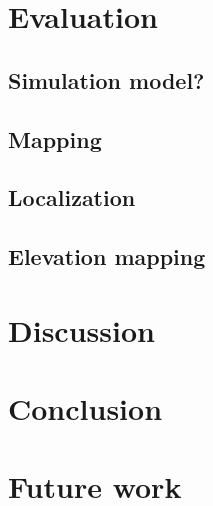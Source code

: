 \documentclass[twoside]{uva-bachelor-thesis}
\begin{document}
\chapter{Evaluation}
	\section{Simulation model?}
	\section{Mapping}
	\section{Localization}
	\section{Elevation mapping}

\chapter{Discussion}

\chapter{Conclusion}

\chapter{Future work}





%


\end{document}
